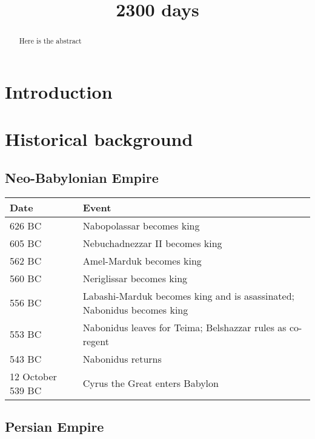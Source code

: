 \documentclass[]{article}
\begin{document}
\begin{abstract}
Here is the abstract
\end{abstract}

\title{2300 days}

\maketitle

\section{Introduction}

\section{Historical background}

\subsection{Neo-Babylonian Empire}
\begin{center}
\begin{tabular}{ll}
\hline
Date & Event \\
\hline\hline
626 BC & Nabopolassar becomes king \\
605 BC & Nebuchadnezzar II becomes king \\
562 BC & Amel-Marduk becomes king \\
560 BC & Neriglissar becomes king \\
556 BC & Labashi-Marduk becomes king and is asassinated; Nabonidus becomes king \\
553 BC & Nabonidus leaves for Teima; Belshazzar rules as co-regent \\
543 BC & Nabonidus returns \\
12 October 539 BC & Cyrus the Great enters Babylon \\
\end{tabular}
\end{center}


\subsection{Persian Empire}
\end{document}
